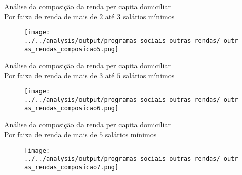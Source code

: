 \begin{frame}[label=_outras_rendas_composicao]{{\small Análise da composição da renda per capita domiciliar \\  Por faixa de renda de mais de $2$ até $3$ salários mínimos}}
\textit{\hyperlink{_novos_resultados}{}}
\begin{figure}
  \centering
  \texttt{[image: ../../analysis/output/programas\_sociais\_outras\_rendas/\_outras\_rendas\_composicao5.png]}
  \caption{}
  \label{fig:_outras_rendas_composicao5}
\end{figure}
\end{frame}


\begin{frame}[label=_outras_rendas_composicao]{{\small Análise da composição da renda per capita domiciliar \\  Por faixa de renda de mais de $3$ até $5$ salários mínimos}}
\textit{\hyperlink{_novos_resultados}{}}
\begin{figure}
  \centering
  \texttt{[image: ../../analysis/output/programas\_sociais\_outras\_rendas/\_outras\_rendas\_composicao6.png]}
  \caption{}
  \label{fig:_outras_rendas_composicao6}
\end{figure}
\end{frame}

\begin{frame}[label=_outras_rendas_composicao]{{\small Análise da composição da renda per capita domiciliar \\  Por faixa de renda de mais de $5$ salários mínimos}}
\textit{\hyperlink{_novos_resultados}{}}
\begin{figure}
  \centering
  \texttt{[image: ../../analysis/output/programas\_sociais\_outras\_rendas/\_outras\_rendas\_composicao7.png]}
  \caption{}
  \label{fig:_outras_rendas_composicao7}
\end{figure}
\end{frame}